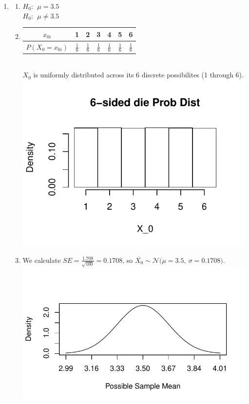 \documentclass[12pt,letterpaper]{article}
\newcommand{\N}[2]{\mathcal{N}\big(#1,~#2\big)}
\begin{document}
\newpage
{}
\begin{multicols}{2}
\begin{enumerate}
\item \begin{enumerate}
\item $H_0: ~~ \mu = 3.5$\\ 
$H_0: ~~ \mu \ne 3.5$
\item \begin{tabular}{|c | c c c c c c |} \hline
$x_{0i}$ & 1 & 2 & 3 & 4 & 5 & 6 \\ \hline
$P(X_0 = x_{0i})$ & $\frac{1}{6}$ & $\frac{1}{6}$ & $\frac{1}{6}$ & $\frac{1}{6}$ & $\frac{1}{6}$ & $\frac{1}{6}$  \\ \hline
\end{tabular} \\
$X_0$ is uniformly distributed across its 6 discrete possibilites (1 through 6).
\\ \includegraphics[scale=0.7]{code/dice_hist}
\item We calculate $SE = \frac{1.708}{\sqrt{100}} = 0.1708$, so $\overline{X_0} \sim \N{\mu=3.5}{\sigma=0.1708}$. \vspace{-15pt}
\\  \includegraphics[scale=0.6]{code/dice_samp_hist}

\end{enumerate}
\end{enumerate}
\end{multicols}
\end{document}
